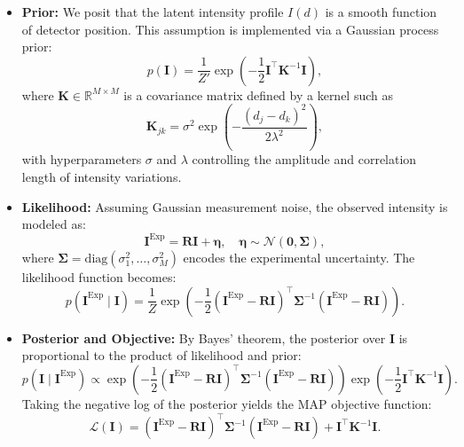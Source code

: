 \documentclass[12pt]{article}
\begin{document}
\begin{itemize}
    \item \textbf{Prior:} We posit that the latent intensity profile \( I(d) \) is a smooth function of detector position. This assumption is implemented via a Gaussian process prior:
    \begin{equation}
        p(\mathbf{I}) = \frac{1}{Z'} \exp\left( -\frac{1}{2} \mathbf{I}^\top \mathbf{K}^{-1} \mathbf{I} \right),
    \end{equation}
    where \( \mathbf{K} \in \mathbb{R}^{M \times M} \) is a covariance matrix defined by a kernel such as
    \begin{equation}
        \mathbf{K}_{jk} = \sigma^2 \exp\left( -\frac{(d_j - d_k)^2}{2\lambda^2} \right),
    \end{equation}
    with hyperparameters \( \sigma \) and \( \lambda \) controlling the amplitude and correlation length of intensity variations.

    \item \textbf{Likelihood:} Assuming Gaussian measurement noise, the observed intensity is modeled as:
    \begin{equation}
        \mathbf{I}^{\mathrm{Exp}} = \mathbf{R} \mathbf{I} + \boldsymbol{\eta}, \quad \boldsymbol{\eta} \sim \mathcal{N}(\mathbf{0}, \boldsymbol{\Sigma}),
    \end{equation}
    where \( \boldsymbol{\Sigma} = \mathrm{diag}(\sigma_1^2, \dots, \sigma_M^2) \) encodes the experimental uncertainty. The likelihood function becomes:
    \begin{equation}
        p(\mathbf{I}^{\mathrm{Exp}} \mid \mathbf{I}) = \frac{1}{Z} \exp\left( -\frac{1}{2} (\mathbf{I}^{\mathrm{Exp}} - \mathbf{R} \mathbf{I})^\top \boldsymbol{\Sigma}^{-1} (\mathbf{I}^{\mathrm{Exp}} - \mathbf{R} \mathbf{I}) \right).
    \end{equation}

    \item \textbf{Posterior and Objective:} By Bayes’ theorem, the posterior over \( \mathbf{I} \) is proportional to the product of likelihood and prior:
    \begin{equation}
        p(\mathbf{I} \mid \mathbf{I}^{\mathrm{Exp}}) \propto 
        \exp\left( -\frac{1}{2} (\mathbf{I}^{\mathrm{Exp}} - \mathbf{R} \mathbf{I})^\top \boldsymbol{\Sigma}^{-1} (\mathbf{I}^{\mathrm{Exp}} - \mathbf{R} \mathbf{I}) \right)
        \exp\left( -\frac{1}{2} \mathbf{I}^\top \mathbf{K}^{-1} \mathbf{I} \right).
    \end{equation}
    Taking the negative log of the posterior yields the MAP objective function:
    \begin{equation}
        \mathcal{L}(\mathbf{I}) = 
        (\mathbf{I}^{\mathrm{Exp}} - \mathbf{R} \mathbf{I})^\top \boldsymbol{\Sigma}^{-1} (\mathbf{I}^{\mathrm{Exp}} - \mathbf{R} \mathbf{I})
        + \mathbf{I}^\top \mathbf{K}^{-1} \mathbf{I}.
    \end{equation}
\end{itemize}
\end{document}
